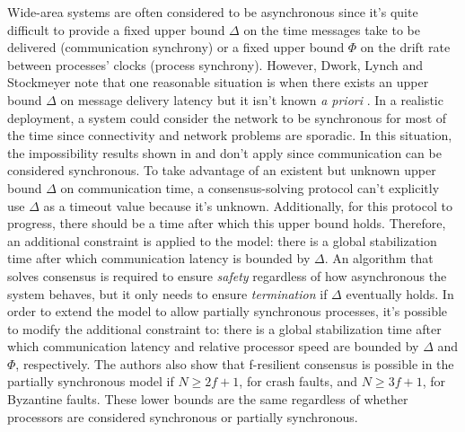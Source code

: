 Wide-area systems are often considered to be asynchronous since it's quite difficult to provide a fixed upper bound $\Delta$ on the time messages take to be delivered (communication synchrony) or a fixed upper bound $\Phi$ on the drift rate between processes' clocks (process synchrony). However, Dwork, Lynch and Stockmeyer note that one reasonable situation is when there exists an upper bound $\Delta$ on message delivery latency but it isn't known \textit{a priori} \cite{Dwork1988}. In a realistic deployment, a system could consider the network to be synchronous for most of the time since connectivity and network problems are sporadic. In this situation, the impossibility results shown in \cite{Fischer1985} and \cite{Dolev1983} don't apply since communication can be considered synchronous. To take advantage of an existent but unknown upper bound $\Delta$ on communication time, a consensus-solving protocol can't explicitly use $\Delta$ as a timeout value because it's unknown. Additionally, for this protocol to progress, there should be a time after which this upper bound holds. Therefore, an additional constraint is applied to the model: there is a global stabilization time after which communication latency is bounded by $\Delta$. An algorithm that solves consensus is required to ensure \textit{safety} regardless of how asynchronous the system behaves, but it only needs to ensure \textit{termination} if $\Delta$ eventually holds. In order to extend the model to allow partially synchronous processes, it's possible to modify the additional constraint to: there is a global stabilization time after which communication latency and relative processor speed are bounded by $\Delta$ and $\Phi$, respectively. The authors also show that f-resilient consensus is possible in the partially synchronous model if $N \geq 2f+1$, for crash faults, and $N \geq 3f+1$, for Byzantine faults. These lower bounds are the same regardless of whether processors are considered synchronous or partially synchronous.\par
